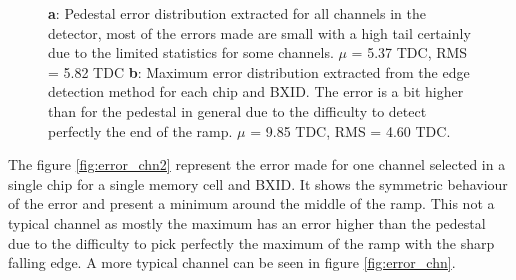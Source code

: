 \begin{figure}[htbp]
	\hfill
	\caption[]{\textbf{a}: Pedestal error distribution extracted for all channels in the detector, most of the errors made are small with a high tail certainly due to the limited statistics for some channels. $\mu$ = 5.37 TDC, RMS = 5.82 TDC \textbf{b}: Maximum error distribution extracted from the edge detection method for each chip and BXID. The error is a bit higher than for the pedestal in general due to the difficulty to detect perfectly the end of the ramp. $\mu$ = 9.85 TDC, RMS = 4.60 TDC.}
	\label{fig:error_dist}
\end{figure}

The figure \ref{fig:error_chn2} represent the error made for one channel selected in a single chip for a single memory cell and BXID. It shows the symmetric behaviour of the error and present a minimum around the middle of the ramp. This not a typical channel as mostly the maximum has an error higher than the pedestal due to the difficulty to pick perfectly the maximum of the ramp with the sharp falling edge. A more typical channel can be seen in figure \ref{fig:error_chn}.


